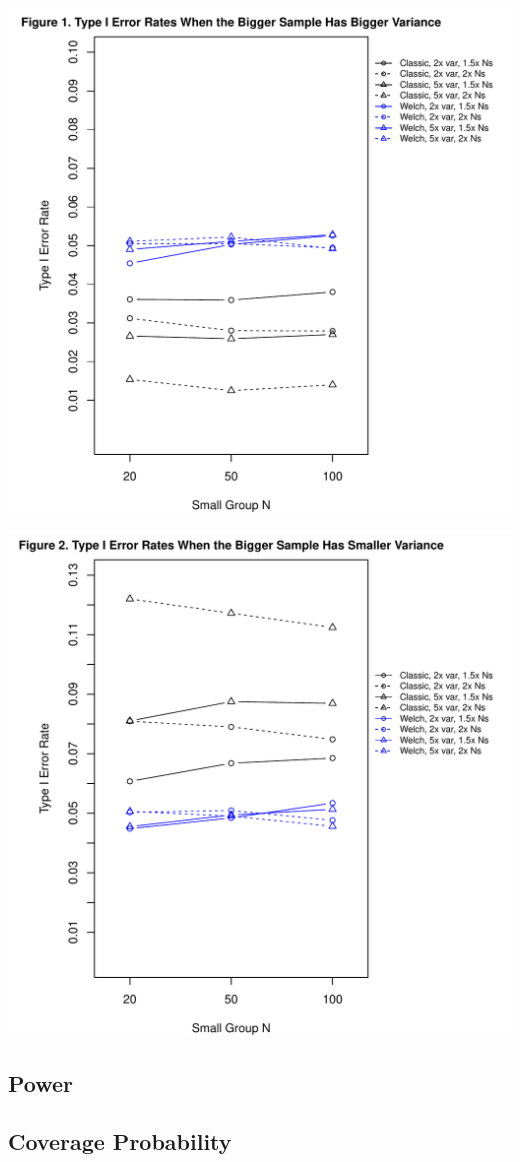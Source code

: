 \documentclass[man]{apa6}\usepackage[]{graphicx}\usepackage[]{color}
\makeatletter
\def\maxwidth{ %
  \ifdim\Gin@nat@width>\linewidth
    \linewidth
  \else
    \Gin@nat@width
  \fi
}
\newenvironment{knitrout}{}{} %
\makeatother
\begin{document}
\begin{knitrout}
\color{fgcolor}
\includegraphics[width=\maxwidth]{figure/ssv_type11} 

\includegraphics[width=\maxwidth]{figure/ssv_type12} 

\end{knitrout}



\subsection{Power}

\subsection{Coverage Probability}
\end{document}
